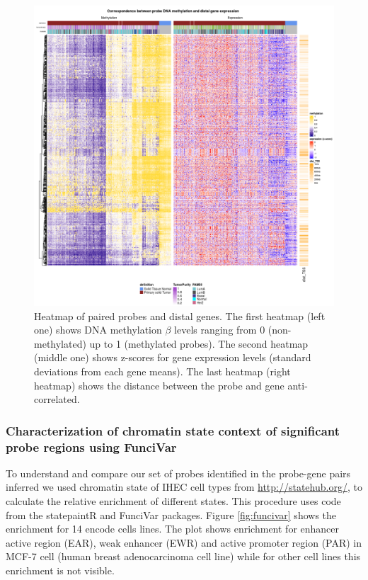 \begin{figure}
\centering
\includegraphics[width=1.0\textwidth]{images/heatmap.png}
\caption[Heatmap of anticorrelated pairs of DNA methylation probes and gene]{\label{fig:heatmap} Heatmap of paired probes and distal genes. The first heatmap (left one) shows DNA methylation $\beta$ levels ranging from 0 (non-methylated) up to 1 (methylated probes).
The second heatmap (middle one) shows z-scores for gene expression levels (standard deviations from each gene means). The last heatmap (right heatmap) shows the distance between the probe
and gene anti-correlated.}
\end{figure}

\clearpage


\clearpage

\subsubsection*{Characterization of chromatin state context of significant probe regions using FunciVar}

To understand and compare our set of probes identified in the probe-gene pairs inferred
we used chromatin state of IHEC cell types
from \url{http://statehub.org/}, to calculate the relative enrichment of
different states.
This procedure uses code from the statepaintR \cite{statepaintr} and FunciVar \cite{funcivar} packages.
Figure \ref{fig:funcivar} shows the enrichment for 14 encode cells lines.
The plot shows enrichment for enhancer active region (EAR), weak enhancer (EWR)
and active promoter region (PAR) in MCF-7 cell (human breast adenocarcinoma cell line)
while for other cell lines this enrichment is not visible.


